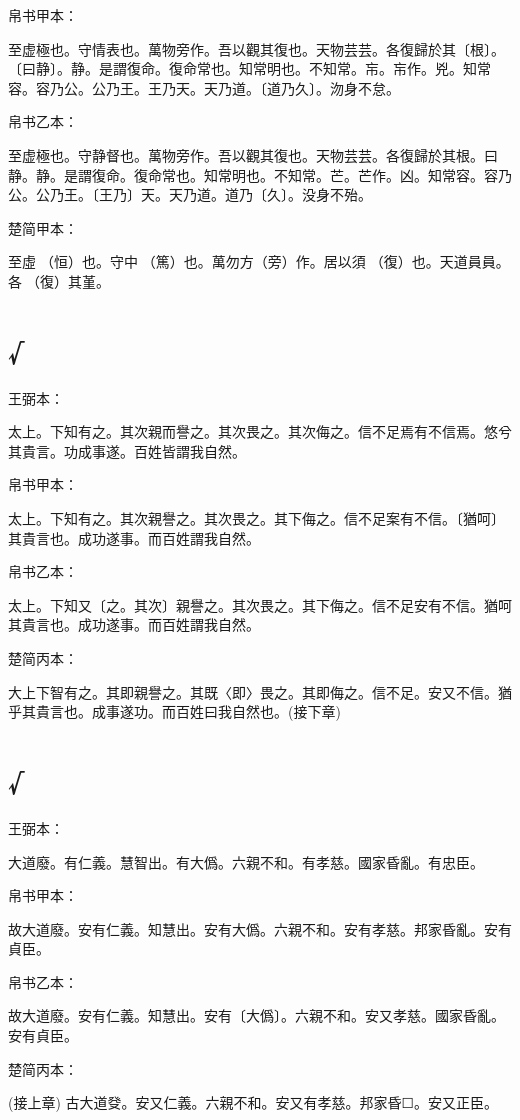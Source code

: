 \documentclass[a5paper]{ctexbook}
\begin{document}
    
    帛书甲本：

    至虚極也。守情表也。萬物旁作。吾以觀其復也。天物芸芸。各復歸於其〔根〕。〔曰静〕。静。是謂復命。復命常也。知常明也。不知常。㠵。㠵作。兇。知常容。容乃公。公乃王。王乃天。天乃道。〔道乃久〕。沕身不怠。

    帛书乙本：

    至虚極也。守静督也。萬物旁作。吾以觀其復也。天物芸芸。各復歸於其根。曰静。静。是謂復命。復命常也。知常明也。不知常。芒。芒作。凶。知常容。容乃公。公乃王。〔王乃〕天。天乃道。道乃〔久〕。没身不殆。

    楚简甲本：

    至虛𠄨（恒）也。守中󶴮（篤）也。萬勿方（旁）作。居以須󵯿（復）也。天道員員。各󵯿（復）其堇。

    \chapter{√}
    王弼本：

    太上。下知有之。其次親而譽之。其次畏之。其次侮之。信不足焉有不信焉。悠兮其貴言。功成事遂。百姓皆謂我自然。

    
    帛书甲本：

    太上。下知有之。其次親譽之。其次畏之。其下侮之。信不足案有不信。〔猶呵〕其貴言也。成功遂事。而百姓謂我自然。

    帛书乙本：

    太上。下知又〔之。其次〕親譽之。其次畏之。其下侮之。信不足安有不信。猶呵其貴言也。成功遂事。而百姓謂我自然。

    楚简丙本：

    大上下智有之。其即親譽之。其既〈即〉畏之。其即侮之。信不足。安又不信。猶乎其貴言也。成事遂功。而百姓曰我自然也。(接下章)

    \chapter{√}
    王弼本：

    大道廢。有仁義。慧智出。有大僞。六親不和。有孝慈。國家昏亂。有忠臣。

    
    帛书甲本：

    故大道廢。安有仁義。知慧出。安有大僞。六親不和。安有孝慈。邦家昏亂。安有貞臣。

    帛书乙本：

    故大道廢。安有仁義。知慧出。安有〔大僞〕。六親不和。安又孝慈。國家昏亂。安有貞臣。

    楚简丙本：

    (接上章) 古大道癹。安又仁義。六親不和。安又有孝慈。邦家昏☐。安又正臣。
\end{document}
